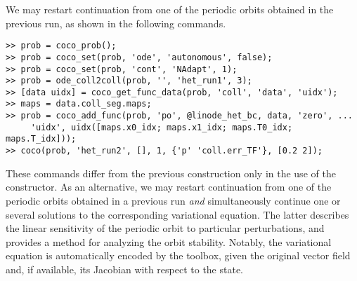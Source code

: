 We may restart continuation from one of the periodic orbits obtained in the previous run, as shown in the following commands.
\begin{lstlisting}[language=coco-highlight]
>> prob = coco_prob();
>> prob = coco_set(prob, 'ode', 'autonomous', false);
>> prob = coco_set(prob, 'cont', 'NAdapt', 1);
>> prob = ode_coll2coll(prob, '', 'het_run1', 3);
>> [data uidx] = coco_get_func_data(prob, 'coll', 'data', 'uidx');
>> maps = data.coll_seg.maps;
>> prob = coco_add_func(prob, 'po', @linode_het_bc, data, 'zero', ...
     'uidx', uidx([maps.x0_idx; maps.x1_idx; maps.T0_idx; maps.T_idx]));
>> coco(prob, 'het_run2', [], 1, {'p' 'coll.err_TF'}, [0.2 2]);
\end{lstlisting}
These commands differ from the previous construction only in the use of the  constructor. As an alternative, we may restart continuation from one of the periodic orbits obtained in a previous run \emph{and} simultaneously continue one or several solutions to the corresponding variational equation. The latter describes the linear sensitivity of the periodic orbit to particular perturbations, and provides a method for analyzing the orbit stability. Notably, the variational equation is automatically encoded by the  toolbox, given the original vector field and, if available, its Jacobian with respect to the state.

